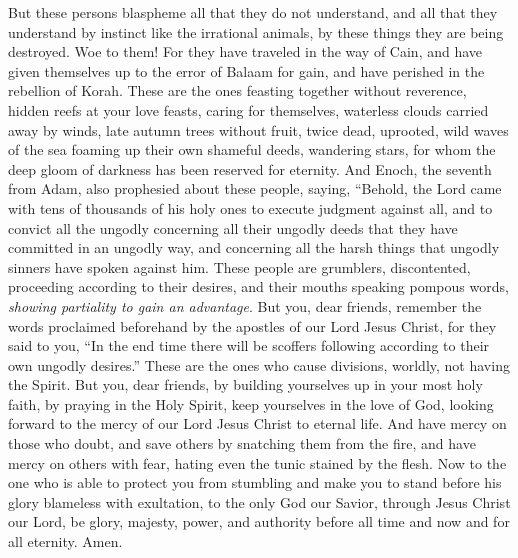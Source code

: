 \begin{biblechapter}
\verse But these persons blaspheme all that they do not understand, and all that they understand by instinct like the irrational animals, by these things they are being destroyed.
\verse Woe to them! For they have traveled in the way of Cain, and have given themselves up to the error of Balaam for gain, and have perished in the rebellion of Korah.
\verse These are the ones feasting together without reverence, hidden reefs at your love feasts, caring for themselves, waterless clouds carried away by winds, late autumn trees without fruit, twice dead, uprooted,
\verse wild waves of the sea foaming up their own shameful deeds, wandering stars, for whom the deep gloom of darkness has been reserved for eternity.
\verse And Enoch, the seventh from Adam, also prophesied about these people, saying, “Behold, the Lord came with tens of thousands of his holy ones
\verse to execute judgment against all, and to convict all the ungodly concerning all their ungodly deeds that they have committed in an ungodly way, and concerning all the harsh things that ungodly sinners have spoken against him.
\verse These people are grumblers, discontented, proceeding according to their desires, and their mouths speaking pompous words, \textit{showing partiality to gain an advantage}.
 But you, dear friends, remember the words proclaimed beforehand by the apostles of our Lord Jesus Christ,
\verse for they said to you, “In the end time there will be scoffers following according to their own ungodly desires.”
\verse These are the ones who cause divisions, worldly, not having the Spirit.
\verse But you, dear friends, by building yourselves up in your most holy faith, by praying in the Holy Spirit,
\verse keep yourselves in the love of God, looking forward to the mercy of our Lord Jesus Christ to eternal life.
\verse And have mercy on those who doubt,
\verse and save others by snatching them from the fire, and have mercy on others with fear, hating even the tunic stained by the flesh.
 Now to the one who is able to protect you from stumbling and make you to stand before his glory blameless with exultation,
\verse to the only God our Savior, through Jesus Christ our Lord, be glory, majesty, power, and authority before all time and now and for all eternity. Amen.
\end{biblechapter}

